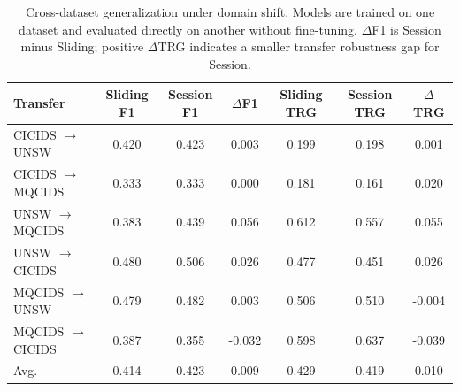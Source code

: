 \begin{table}[H]
\centering
\scriptsize
\caption{Cross-dataset generalization under domain shift. Models are trained on one dataset and evaluated directly on another without fine-tuning. $\Delta$F1 is Session minus Sliding; positive $\Delta$TRG indicates a smaller transfer robustness gap for Session.}
\label{tab:cross_dataset}
\setlength{\tabcolsep}{2.6pt}
\begin{tabular}{lcccccc}
\toprule
Transfer & Sliding F1 & Session F1 & $\Delta$F1 & Sliding TRG & Session TRG & $\Delta$TRG \\
\midrule
CICIDS $\rightarrow$ UNSW & 0.420 & 0.423 & 0.003 & 0.199 & 0.198 & 0.001 \\
CICIDS $\rightarrow$ MQCIDS & 0.333 & 0.333 & 0.000 & 0.181 & 0.161 & 0.020 \\
UNSW $\rightarrow$ MQCIDS & 0.383 & 0.439 & 0.056 & 0.612 & 0.557 & 0.055 \\
UNSW $\rightarrow$ CICIDS & 0.480 & 0.506 & 0.026 & 0.477 & 0.451 & 0.026 \\
MQCIDS $\rightarrow$ UNSW & 0.479 & 0.482 & 0.003 & 0.506 & 0.510 & -0.004 \\
MQCIDS $\rightarrow$ CICIDS & 0.387 & 0.355 & -0.032 & 0.598 & 0.637 & -0.039 \\
\midrule
Avg. & 0.414 & 0.423 & 0.009 & 0.429 & 0.419 & 0.010 \\
\bottomrule
\end{tabular}
\vspace{-0.8em}
\end{table}
